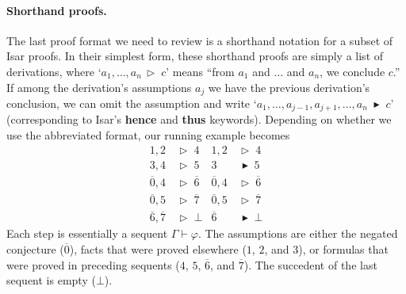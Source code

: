 \documentclass[withtimes,a4paper,12pt]{easychair}
\newcommand\keyw[1]{\textsf{\textbf{#1}}}
\let\B=\overline
\newcommand\have{\mathrel{\,\vartriangleright\;}}
\newcommand\hencesym{\blacktriangleright}
\newcommand\hence{\mathrel{\;\hencesym\;}}
\begin{document}
\paragraph{Shorthand proofs.}
The last proof format we need to review is a shorthand notation for a subset of
Isar proofs. In their simplest form, these shorthand proofs are simply a list of
derivations, where `$a_1, \ldots, a_n \have c$' means ``from $a_1$ and $\ldots$
and $a_n$, we conclude $c$.'' If among the derivation's assumptions $a_j$
we have the previous derivation's conclusion, we can omit the assumption
and write `$a_1, \ldots, a_{j-1}, a_{j+1}, \ldots, a_n \hence c$' (corresponding
to Isar's \keyw{hence} and \keyw{thus} keywords). Depending on whether we use
the abbreviated format, our running example becomes
%
\begin{align*}
1, 2 & \have 4 &
    1, 2 & \have 4 \\
3, 4 & \have 5 &
    3 & \hence 5 \\
\B{0}, 4 & \have \B{6} &
    \B{0}, 4 & \have \B{6} \\
\B{0}, 5 & \have \B{7} &
    \B{0}, 5 & \have \B{7} \\
\B{6}, \B{7} & \have \bot &
    \B{6} & \hence \bot
\end{align*}
%
Each step is essentially a sequent $\Gamma \vdash \varphi$. The assumptions are
either the negated conjecture ($\B{0}$), facts that were proved elsewhere ($1$,
$2$, and $3$), or formulas that were proved in preceding sequents ($4$, $5$,
$\B{6}$, and $\B{7}$). The succedent of the last sequent is empty ($\bot$).
\end{document}
